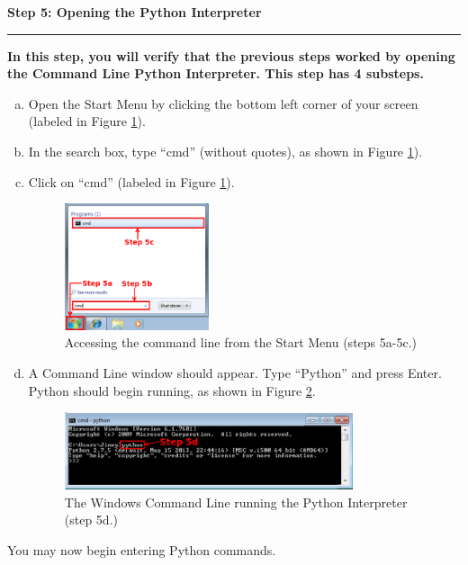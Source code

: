 \documentclass[11pt,english]{article}
\newcommand{\myhrule}{\vspace{0.3cm}\hrule\vspace{0.3cm}}
\begin{document}
\newpage
{\Large {\bf Step 5: Opening the Python Interpreter}}
\myhrule
{\bf In this step, you will verify that the previous steps worked by opening
the Command Line Python Interpreter. This step has 4 substeps.}\\

\begin{enumerate}[a.]
\item Open the Start Menu by clicking the bottom left corner of your screen
(labeled in Figure \ref{fig:dia9}).
\item In the search box, type ``cmd'' (without quotes), as shown in Figure
\ref{fig:dia9}).
\item Click on ``cmd'' (labeled in Figure \ref{fig:dia9}).
\begin{figure}[h]
\begin{center}
\includegraphics[width=0.4\textwidth]{dia9}
\end{center}
\vspace{-0.5cm}
\caption{Accessing the command line from the Start Menu (steps 5a-5c.)}
\label{fig:dia9}
\end{figure}
\item A Command Line window should appear. Type ``Python'' and press Enter.
Python should begin running, as shown in Figure \ref{fig:dia10}.
\begin{figure}[h]
\begin{center}
\includegraphics[width=0.8\textwidth]{dia10}
\end{center}
\vspace{-0.5cm}
\caption{The Windows Command Line running the Python Interpreter (step 5d.)}
\label{fig:dia10}
\end{figure}
\end{enumerate}
You may now begin entering Python commands.
\end{document}
